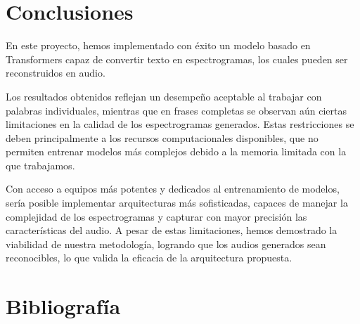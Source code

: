 \documentclass{article}
\begin{document}
\section{\Huge Conclusiones}
\begin{Large}
\vspace{0.5cm}

En este proyecto, hemos implementado con éxito un modelo basado en Transformers capaz de convertir texto en espectrogramas, los cuales pueden ser reconstruidos en audio.

Los resultados obtenidos reflejan un desempeño aceptable al trabajar con palabras individuales, mientras que en frases completas se observan aún ciertas limitaciones en la calidad de los espectrogramas generados. Estas restricciones se deben principalmente a los recursos computacionales disponibles, que no permiten entrenar modelos más complejos debido a la memoria limitada con la que trabajamos.

Con acceso a equipos más potentes y dedicados al entrenamiento de modelos, sería posible implementar arquitecturas más sofisticadas, capaces de manejar la complejidad de los espectrogramas y capturar con mayor precisión las características del audio. A pesar de estas limitaciones, hemos demostrado la viabilidad de nuestra metodología, logrando que los audios generados sean reconocibles, lo que valida la eficacia de la arquitectura propuesta.


\end{Large}
\vspace{2cm}
\section{\Huge Bibliografía}
\end{document}
